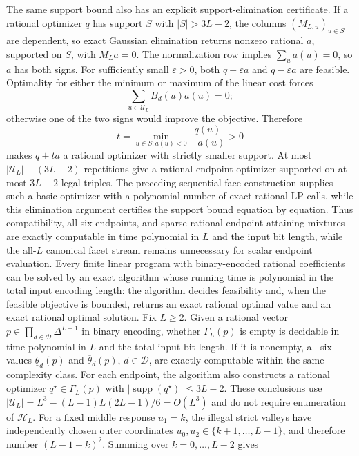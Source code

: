 The same support bound also has an explicit support-elimination certificate.  If a rational optimizer \(q\) has support \(S\) with \(|S|>3L-2\), the columns \((M_{L,u})_{u\in S}\) are dependent, so exact Gaussian elimination returns nonzero rational \(a\), supported on \(S\), with \(M_La=0\).  The normalization row implies \(\sum_ua(u)=0\), so \(a\) has both signs.  For sufficiently small \(\varepsilon>0\), both \(q+\varepsilon a\) and \(q-\varepsilon a\) are feasible.  Optimality for either the minimum or maximum of the linear cost forces
\[
 \sum_{u\in\mathcal U_L}B_d(u)a(u)=0;
\]
otherwise one of the two signs would improve the objective.  Therefore
\[
 t=\min_{u\in S:a(u)<0}\frac{q(u)}{-a(u)}>0
\]
makes \(q+ta\) a rational optimizer with strictly smaller support.  At most \(|\mathcal U_L|-(3L-2)\) repetitions give a rational endpoint optimizer supported on at most \(3L-2\) legal triples.  The preceding sequential-face construction supplies such a basic optimizer with a polynomial number of exact rational-LP calls, while this elimination argument certifies the support bound equation by equation.  Thus compatibility, all six endpoints, and sparse rational endpoint-attaining mixtures are exactly computable in time polynomial in \(L\) and the input bit length, while the all-\(L\) canonical facet stream remains unnecessary for scalar endpoint evaluation.
Every finite linear program with binary-encoded rational coefficients can be solved by an exact algorithm whose running time is polynomial in the total input encoding length: the algorithm decides feasibility and, when the feasible objective is bounded, returns an exact rational optimal value and an exact rational optimal solution.
Fix \(L\ge2\).  Given a rational vector \(p\in\prod_{d\in\mathcal D}\Delta^{L-1}\) in binary encoding, whether \(\Gamma_L(p)\) is empty is decidable in time polynomial in \(L\) and the total input bit length.  If it is nonempty, all six values \(\underline\theta_d(p)\) and \(\overline\theta_d(p)\), \(d\in\mathcal D\), are exactly computable within the same complexity class.  For each endpoint, the algorithm also constructs a rational optimizer \(q^\star\in\Gamma_L(p)\) with \(|\operatorname{supp}(q^\star)|\le3L-2\).  These conclusions use \(|\mathcal U_L|=L^3-(L-1)L(2L-1)/6=O(L^3)\) and do not require enumeration of \(\mathcal H_L\).
For a fixed middle response \(u_1=k\), the illegal strict valleys have independently chosen outer coordinates \(u_0,u_2\in\{k+1,\ldots,L-1\}\), and therefore number \((L-1-k)^2\).  Summing over \(k=0,\ldots,L-2\) gives
